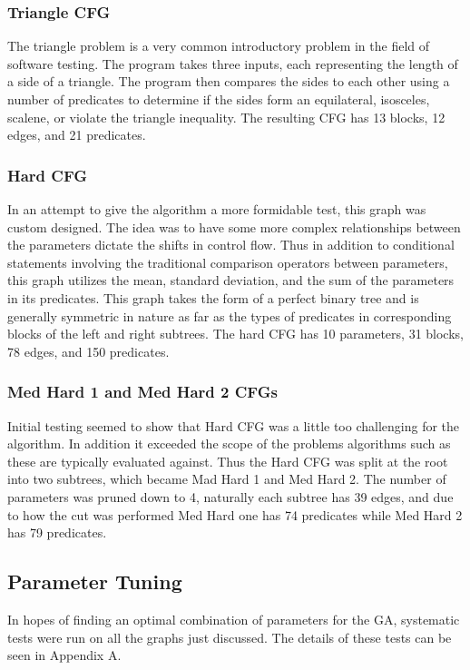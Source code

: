 \documentclass[runningheads]{llncs}
\begin{document}
\subsubsection{Triangle CFG}
The triangle problem is a very common introductory problem in the field of software testing. The program takes three inputs, each representing the length of a side of a triangle. The program then compares the sides to each other using a number of predicates to determine if the sides form an equilateral, isosceles, scalene, or violate the triangle inequality. The resulting CFG has 13 blocks, 12 edges, and 21 predicates.

\subsubsection{Hard CFG}
In an attempt to give the algorithm a more formidable test, this graph was custom designed. The idea was to have some more complex relationships between the parameters dictate the shifts in control flow. Thus in addition to conditional statements involving the traditional comparison operators between parameters, this graph utilizes the mean, standard deviation, and the sum of the parameters in its predicates. This graph takes the form of a perfect binary tree and is generally symmetric in nature as far as the types of predicates in corresponding blocks of the left and right subtrees. The hard CFG has 10 parameters, 31 blocks, 78 edges, and 150 predicates.

\subsubsection{Med Hard 1 and Med Hard 2 CFGs}
Initial testing seemed to show that Hard CFG was a little too challenging for the algorithm. In addition it exceeded the scope of the problems algorithms such as these are typically evaluated against. Thus the Hard CFG was split at the root into two subtrees, which became Mad Hard 1 and Med Hard 2. The number of parameters was pruned down to 4, naturally each subtree has 39 edges, and due to how the cut was performed Med Hard one has 74 predicates while Med Hard 2 has 79 predicates.

\subsection{Parameter Tuning} 
In hopes of finding an optimal combination of parameters for the GA, systematic tests were run on all the graphs just discussed. The details of these tests can be seen in Appendix A.
\end{document}
